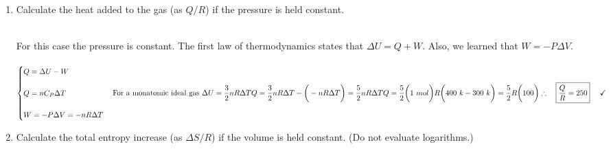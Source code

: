 \documentclass[fleqn]{article}
\begin{document}
\begin{enumerate}
    \item Calculate the heat added to the gas (as $Q/R$) if the pressure is held constant.

      \textcolor{hwColor}{
        \\
        For this case the pressure is constant. The first law of thermodynamics states that 
        $\Delta U=Q+W$. Also, we learned that $W=-P \Delta V$.
        \\
        \\
        $
          \begin{cases}
            Q=\Delta U-W
            \\
            \\
            Q=n C_P \Delta T
            \\
            \\
            W=-P \Delta V=-nR \Delta T
          \end{cases}
          \\
          \\
          \\
          \text{For a monatomic ideal gas } \Delta U=\dfrac{3}{2} nR \Delta T
          \\
          \\
          \\
          Q=\dfrac{3}{2} n R \Delta T- \bigg( -n R \Delta T \bigg)=\dfrac{5}{2} n R \Delta T
          \\
          \\
          \\
          Q=\dfrac{5}{2} \bigg( 1 ~ mol \bigg) R \bigg( 400 ~ k-300 ~ k \bigg)=\dfrac{5}{2} R \bigg( 100 \bigg)
          \\
          \\
          \\
          \therefore ~~~ \boxed{
            \dfrac{Q}{R}=250
          } ~~~~ \checkmark
          \\
          \\
        $
      }

    \item Calculate the total entropy increase (as $\Delta S/R$) if the volume is held constant. (Do not evaluate
    logarithms.)


\end{enumerate}
\end{document}
